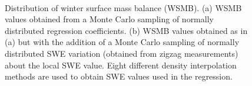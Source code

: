 \documentclass[12pt]{article}
\begin{document}
\begin{figure}[H]
	\centering
	\\%
	\caption{Distribution of winter surface mass balance (WSMB). (a)  WSMB values obtained from a Monte Carlo sampling of normally distributed regression coefficients. (b) WSMB values obtained as in (a) but with the addition of a Monte Carlo sampling of normally distributed SWE variation (obtained from zigzag measurements) about the local SWE value. Eight different density interpolation methods are used to obtain SWE values used in the regression.}
	\label{fig:WSMB_allDensity}
\end{figure}
\end{document}
